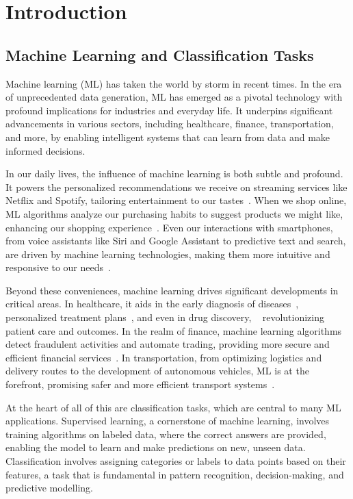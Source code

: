 \documentclass[letterpaper,10pt]{article}
\begin{document}
\newpage
\section{Introduction}
\subsection{Machine Learning and Classification Tasks} \label{beyondscopestart}
Machine learning (ML) has taken the world by storm in recent times. In the era of unprecedented data generation, ML has emerged as a pivotal technology with profound implications for industries and everyday life. It underpins significant advancements in various sectors, including healthcare, finance, transportation, and more, by enabling intelligent systems that can learn from data and make informed decisions. \par
In our daily lives, the influence of machine learning is both subtle and profound. It powers the personalized recommendations we receive on streaming services like Netflix and Spotify, tailoring entertainment to our tastes~\cite{NetflixRecommendations,SpotifyPlaylistGen}. When we shop online, ML algorithms analyze our purchasing habits to suggest products we might like, enhancing our shopping experience~\cite{MediaRecommendationSystemsSurvey}. Even our interactions with smartphones, from voice assistants like Siri and Google Assistant to predictive text and search, are driven by machine learning technologies, making them more intuitive and responsive to our needs~\cite{GoogleAssistantLookAndTalk, SiriML}.
\par
Beyond these conveniences, machine learning drives significant developments in critical areas. In healthcare, it aids in the early diagnosis of diseases~\cite{diabetesclassification}, personalized treatment plans~\cite{PersonalisedMedicineDeepLearning}, and even in drug discovery, ~\cite{DrugDiscoveryDeepLearning} revolutionizing patient care and outcomes. In the realm of finance, machine learning algorithms detect fraudulent activities and automate trading, providing more secure and efficient financial services~\cite{FinanceFraudDeepLearning}. In transportation, from optimizing logistics and delivery routes to the development of autonomous vehicles, ML is at the forefront, promising safer and more efficient transport systems~\cite{TransportationLogisticsML}. \par
At the heart of all of this are classification tasks, which are central to many ML applications. Supervised learning, a cornerstone of machine learning, involves training algorithms on labeled data, where the correct answers are provided, enabling the model to learn and make predictions on new, unseen data. Classification involves assigning categories or labels to data points based on their features, a task that is fundamental in pattern recognition, decision-making, and predictive modelling.
\end{document}
